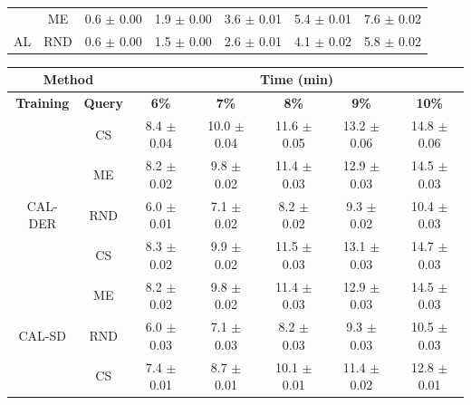 \begin{table}[htbp]
\begin{tabular*}{\linewidth}{c|c|@{\extracolsep{\fill}}ccccc}
 & ME & 0.6 $\pm$ {\small 0.00} & 1.9 $\pm$ {\small 0.00} & 3.6 $\pm$ {\small 0.01} & 5.4 $\pm$ {\small 0.01} & 7.6 $\pm$ {\small 0.02}\\

\multirow{-3}{*}{\raggedright\arraybackslash AL} & RND & 0.6 $\pm$ {\small 0.00} & 1.5 $\pm$ {\small 0.00} & 2.6 $\pm$ {\small 0.01} & 4.1 $\pm$ {\small 0.02} & 5.8 $\pm$ {\small 0.02}\\
\bottomrule
\end{tabular*}
\vspace{0.5em}

\begin{tabular*}{\linewidth}{c|c|@{\extracolsep{\fill}}ccccc}
\toprule
\multicolumn{2}{c|}{\textbf{Method}} & \multicolumn{5}{c}{\textbf{Time (min)}} \\
\midrule
\textbf{Training} & \textbf{Query} & \textbf{6\%} & \textbf{7\%} & \textbf{8\%} & \textbf{9\%} & \textbf{10\%}\\
\midrule
 & CS & 8.4 $\pm$ {\small 0.04} & 10.0 $\pm$ {\small 0.04} & 11.6 $\pm$ {\small 0.05} & 13.2 $\pm$ {\small 0.06} & 14.8 $\pm$ {\small 0.06}\\

 & ME & 8.2 $\pm$ {\small 0.02} & 9.8 $\pm$ {\small 0.02} & 11.4 $\pm$ {\small 0.03} & 12.9 $\pm$ {\small 0.03} & 14.5 $\pm$ {\small 0.03}\\

\multirow{-3}{*}{\raggedright\arraybackslash CAL-DER} & RND & 6.0 $\pm$ {\small 0.01} & 7.1 $\pm$ {\small 0.02} & 8.2 $\pm$ {\small 0.02} & 9.3 $\pm$ {\small 0.02} & 10.4 $\pm$ {\small 0.03}\\
\midrule
 & CS & 8.3 $\pm$ {\small 0.02} & 9.9 $\pm$ {\small 0.02} & 11.5 $\pm$ {\small 0.03} & 13.1 $\pm$ {\small 0.03} & 14.7 $\pm$ {\small 0.03}\\

 & ME & 8.2 $\pm$ {\small 0.02} & 9.8 $\pm$ {\small 0.02} & 11.4 $\pm$ {\small 0.03} & 12.9 $\pm$ {\small 0.03} & 14.5 $\pm$ {\small 0.03}\\

\multirow{-3}{*}{\raggedright\arraybackslash CAL-SD} & RND & 6.0 $\pm$ {\small 0.03} & 7.1 $\pm$ {\small 0.03} & 8.2 $\pm$ {\small 0.03} & 9.3 $\pm$ {\small 0.03} & 10.5 $\pm$ {\small 0.03}\\
\midrule
 & CS & 7.4 $\pm$ {\small 0.01} & 8.7 $\pm$ {\small 0.01} & 10.1 $\pm$ {\small 0.01} & 11.4 $\pm$ {\small 0.02} & 12.8 $\pm$ {\small 0.01}\\


\end{tabular*}
\end{table}
